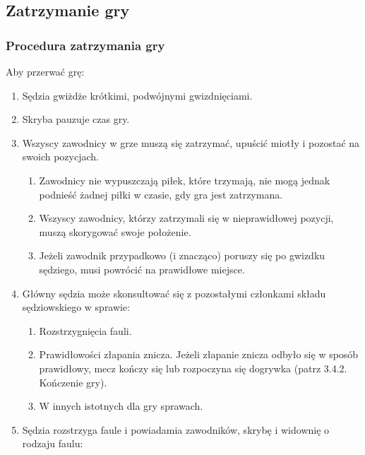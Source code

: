 \documentclass[12pt]{article}
\begin{document}
\subsection{Zatrzymanie gry}

\subsubsection{Procedura zatrzymania gry}
Aby przerwać grę:

\begin{enumerate}
\item
    Sędzia gwiżdże krótkimi, podwójnymi gwizdnięciami.
  \item
    Skryba pauzuje czas gry.
  \item
    Wszyscy zawodnicy w grze muszą się zatrzymać, upuścić miotły i
  pozostać na swoich pozycjach.
  
  \begin{enumerate}
  \item
        Zawodnicy nie wypuszczają piłek, które trzymają, nie mogą jednak
    podnieść żadnej piłki w czasie, gdy gra jest zatrzymana.
      \item
        Wszyscy zawodnicy, którzy zatrzymali się w nieprawidłowej pozycji,
    muszą skorygować swoje położenie.
      \item
        Jeżeli zawodnik przypadkowo (i znacząco) poruszy się po gwizdku
    sędziego, musi powrócić na prawidłowe miejsce.
      \end{enumerate}
\item
    Główny sędzia może skonsultować się z pozostałymi członkami składu
  sędziowskiego w sprawie:
  
  \begin{enumerate}
  \item
        Rozstrzygnięcia fauli.
      \item
        Prawidłowości złapania znicza. Jeżeli złapanie znicza odbyło się w
    sposób prawidłowy, mecz kończy się lub rozpoczyna się dogrywka
    (patrz 3.4.2. Kończenie gry).
      \item
        W innych istotnych dla gry sprawach.
      \end{enumerate}
\item
    Sędzia rozstrzyga faule i powiadamia zawodników, skrybę i widownię o
  rodzaju faulu:
  

\end{enumerate}
\end{document}
